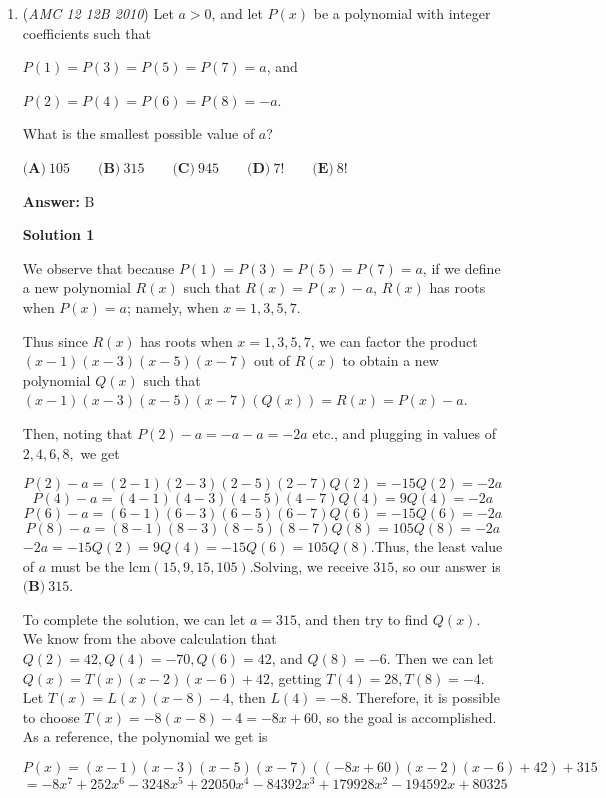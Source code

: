 \begin{enumerate}
 


	\item (\textit{AMC 12 12B 2010}) Let $a > 0$, and let $P(x)$ be a polynomial with integer coefficients such that


 
$P(1) = P(3) = P(5) = P(7) = a$, and

$P(2) = P(4) = P(6) = P(8) = -a$.


 


 What is the smallest possible value of $a$?


 $\textbf{(A)}\ 105 \qquad \textbf{(B)}\ 315 \qquad \textbf{(C)}\ 945 \qquad \textbf{(D)}\ 7! \qquad \textbf{(E)}\ 8!$

 \textbf{Answer: }B



\textbf{Solution 1}

We observe that because $P(1) = P(3) = P(5) = P(7) = a$, if we define a new polynomial $R(x)$ such that $R(x) = P(x) - a$, $R(x)$ has roots when $P(x) = a$; namely, when $x=1,3,5,7$.

 Thus since $R(x)$ has roots when $x=1,3,5,7$, we can factor the product $(x-1)(x-3)(x-5)(x-7)$ out of $R(x)$ to obtain a new polynomial $Q(x)$ such that $(x-1)(x-3)(x-5)(x-7)(Q(x)) = R(x) = P(x) - a$.

 Then, noting that $P(2)-a=-a-a=-2a$ etc., and plugging in values of $2,4,6,8,$ we get 

 
 \[P(2)-a=(2-1)(2-3)(2-5)(2-7)Q(2) = -15Q(2) = -2a\]
 \[P(4)-a=(4-1)(4-3)(4-5)(4-7)Q(4) = 9Q(4) = -2a\]
 \[P(6)-a=(6-1)(6-3)(6-5)(6-7)Q(6) = -15Q(6) = -2a\]
 \[P(8)-a=(8-1)(8-3)(8-5)(8-7)Q(8) = 105Q(8) = -2a\]
$-2a=-15Q(2)=9Q(4)=-15Q(6)=105Q(8).$Thus, the least value of $a$ must be the $\text{lcm}(15,9,15,105)$.Solving, we receive $315$, so our answer is $\boxed{\textbf{(B)}\ 315}$.

 To complete the solution, we can let $a = 315$, and then try to find $Q(x)$. We know from the above calculation that $Q(2)=42, Q(4)=-70, Q(6)=42$, and $Q(8)=-6$. Then we can let $Q(x) = T(x)(x-2)(x-6)+42$, getting $T(4)=28, T(8)=-4$. Let $T(x)=L(x)(x-8)-4$, then $L(4)=-8$. Therefore, it is possible to choose $T(x) = -8(x-8)-4 = -8x + 60$, so the goal is accomplished. As a reference, the polynomial we get is

 
 \[P(x) = (x-1)(x-3)(x-5)(x-7)((-8x + 60)(x-2)(x-6)+42) + 315\]
 \[= -8 x^7+252 x^6-3248 x^5+22050 x^4-84392 x^3+179928 x^2-194592 x+80325\]





\end{enumerate}
